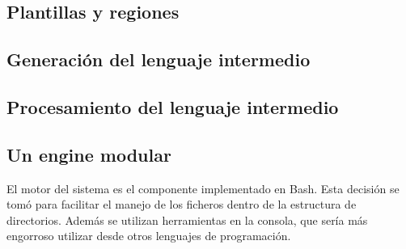 \subsection{Plantillas y regiones}

\subsection{Generación del lenguaje intermedio}

\subsection{Procesamiento del lenguaje intermedio}

\subsection{Un engine modular}

El motor del sistema es el componente implementado en Bash. Esta decisión se tomó para facilitar el manejo de los ficheros dentro de la estructura de directorios. Además se utilizan herramientas en la consola, que sería más engorroso utilizar desde otros lenguajes de programación.

